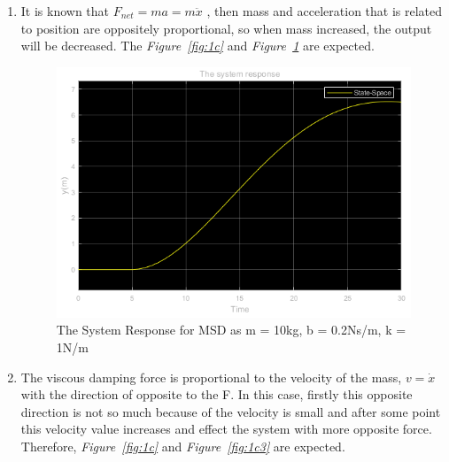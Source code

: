 \documentclass[a4paper,12pt]{article}
\begin{document}
\begin{enumerate}
\begin{enumerate}
\begin{enumerate}
			
			
			\item It is known that $F_{net}=ma=m\ddot{x} $ , then mass and acceleration that is related to position are oppositely proportional, so when mass increased, the output will be decreased. The \textit{Figure~\ref{fig:1c}} and \textit{Figure~\ref{fig:1c2}} are expected.
			
			\begin{figure}[H]
				\center
				\setlength{\unitlength}{\textwidth} 
				\includegraphics[width=0.8\unitlength]{images/1c2y}
				\caption{\label{fig:1c2} The System Response for MSD as m = 10kg, b = 0.2Ns/m, k = 1N/m }
			\end{figure}
			
			\item  The viscous damping force is proportional to the velocity of the mass, $v=\dot{x}$ with the direction of opposite to the F. In this case, firstly this opposite direction is not so much because of the velocity is small and after some point this velocity value increases and effect the system with more opposite force. Therefore, \textit{Figure~\ref{fig:1c}} and \textit{Figure~\ref{fig:1c3}} are expected.
			

\end{enumerate}
\end{enumerate}
\end{enumerate}
\end{document}
